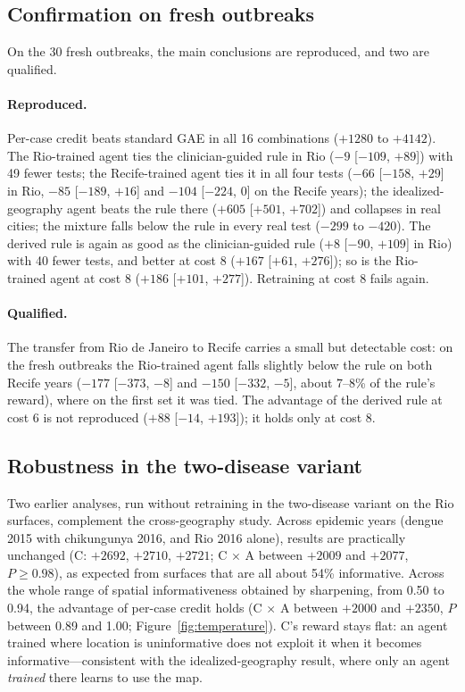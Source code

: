 \documentclass[11pt,a4paper]{article}
\begin{document}
\subsection{Confirmation on fresh outbreaks}
\label{sec:res_confirm}

On the 30 fresh outbreaks, the main conclusions are reproduced, and two are qualified.

\paragraph{Reproduced.} Per-case credit beats standard GAE in all 16 combinations ($+1280$ to $+4142$). The Rio-trained agent ties the clinician-guided rule in Rio ($-9$ [$-109$, $+89$]) with 49 fewer tests; the Recife-trained agent ties it in all four tests ($-66$ [$-158$, $+29$] in Rio, $-85$ [$-189$, $+16$] and $-104$ [$-224$, $0$] on the Recife years); the idealized-geography agent beats the rule there ($+605$ [$+501$, $+702$]) and collapses in real cities; the mixture falls below the rule in every real test ($-299$ to $-420$). The derived rule is again as good as the clinician-guided rule ($+8$ [$-90$, $+109$] in Rio) with 40 fewer tests, and better at cost 8 ($+167$ [$+61$, $+276$]); so is the Rio-trained agent at cost 8 ($+186$ [$+101$, $+277$]). Retraining at cost 8 fails again.

\paragraph{Qualified.} The transfer from Rio de Janeiro to Recife carries a small but detectable cost: on the fresh outbreaks the Rio-trained agent falls slightly below the rule on both Recife years ($-177$ [$-373$, $-8$] and $-150$ [$-332$, $-5$], about 7--8\% of the rule's reward), where on the first set it was tied. The advantage of the derived rule at cost 6 is not reproduced ($+88$ [$-14$, $+193$]); it holds only at cost 8.

\subsection{Robustness in the two-disease variant}
\label{sec:res_robust}

Two earlier analyses, run without retraining in the two-disease variant on the Rio surfaces, complement the cross-geography study. Across epidemic years (dengue 2015 with chikungunya 2016, and Rio 2016 alone), results are practically unchanged (C: $+2692$, $+2710$, $+2721$; C $\times$ A between $+2009$ and $+2077$, $P \ge 0.98$), as expected from surfaces that are all about 54\% informative. Across the whole range of spatial informativeness obtained by sharpening, from 0.50 to 0.94, the advantage of per-case credit holds (C $\times$ A between $+2000$ and $+2350$, $P$ between 0.89 and 1.00; Figure~\ref{fig:temperature}). C's reward stays flat: an agent trained where location is uninformative does not exploit it when it becomes informative---consistent with the idealized-geography result, where only an agent \emph{trained} there learns to use the map.
\end{document}
